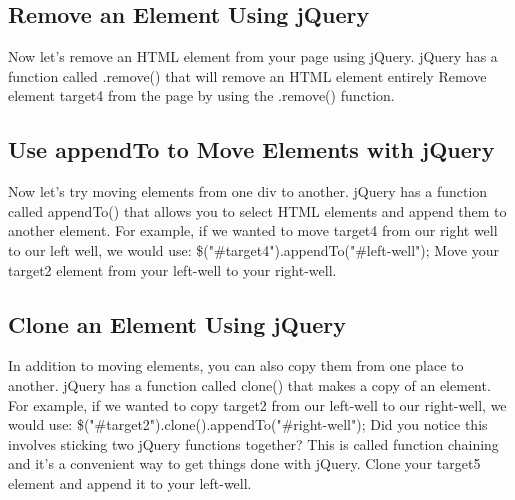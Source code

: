 \documentclass{article}%
\begin{document}
%
\subsection{Remove an Element Using jQuery}%
\label{subsec:RemoveanElementUsingjQuery}%
Now let's remove an HTML element from your page using jQuery.\newline%
jQuery has a function called .remove() that will remove an HTML element entirely\newline%
Remove element target4 from the page by using the .remove() function.\newline%

%
\subsection{Use appendTo to Move Elements with jQuery}%
\label{subsec:UseappendTotoMoveElementswithjQuery}%
Now let's try moving elements from one div to another.\newline%
jQuery has a function called appendTo() that allows you to select HTML elements and append them to another element.\newline%
For example, if we wanted to move target4 from our right well to our left well, we would use:\newline%
\$("\#target4").appendTo("\#left{-}well");\newline%
Move your target2 element from your left{-}well to your right{-}well.\newline%

%
\subsection{Clone an Element Using jQuery}%
\label{subsec:CloneanElementUsingjQuery}%
In addition to moving elements, you can also copy them from one place to another.\newline%
jQuery has a function called clone() that makes a copy of an element.\newline%
For example, if we wanted to copy target2 from our left{-}well to our right{-}well, we would use:\newline%
\$("\#target2").clone().appendTo("\#right{-}well");\newline%
Did you notice this involves sticking two jQuery functions together? This is called function chaining and it's a convenient way to get things done with jQuery.\newline%
Clone your target5 element and append it to your left{-}well.\newline%
\end{document}
